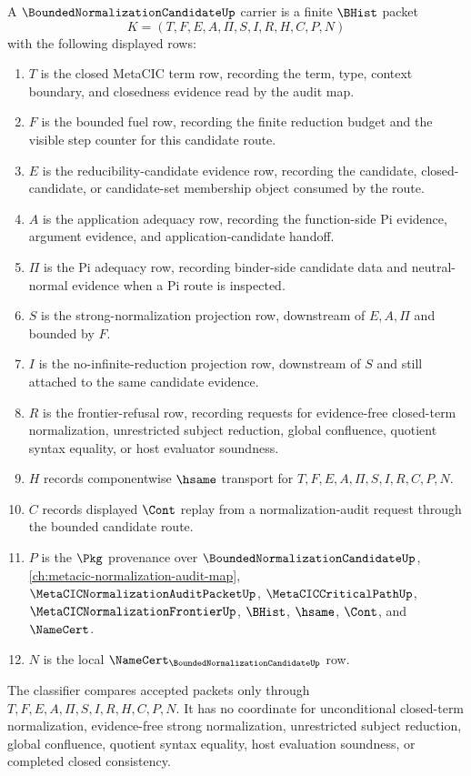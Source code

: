 \begin{definition}
\label{def:bounded-normalization-candidate-carrier}
A $\BoundedNormalizationCandidateUp$ carrier is a finite $\BHist$ packet
$$
K=(T,F,E,A,\Pi,S,I,R,H,C,P,N)
$$
with the following displayed rows:
\begin{enumerate}
\item $T$ is the closed MetaCIC term row, recording the term, type, context boundary, and closedness evidence read by the audit map.
\item $F$ is the bounded fuel row, recording the finite reduction budget and the visible step counter for this candidate route.
\item $E$ is the reducibility-candidate evidence row, recording the candidate, closed-candidate, or candidate-set membership object consumed by the route.
\item $A$ is the application adequacy row, recording the function-side Pi evidence, argument evidence, and application-candidate handoff.
\item $\Pi$ is the Pi adequacy row, recording binder-side candidate data and neutral-normal evidence when a Pi route is inspected.
\item $S$ is the strong-normalization projection row, downstream of $E,A,\Pi$ and bounded by $F$.
\item $I$ is the no-infinite-reduction projection row, downstream of $S$ and still attached to the same candidate evidence.
\item $R$ is the frontier-refusal row, recording requests for evidence-free closed-term normalization, unrestricted subject reduction, global confluence, quotient syntax equality, or host evaluator soundness.
\item $H$ records componentwise $\hsame$ transport for $T,F,E,A,\Pi,S,I,R,C,P,N$.
\item $C$ records displayed $\Cont$ replay from a normalization-audit request through the bounded candidate route.
\item $P$ is the $\Pkg$ provenance over $\BoundedNormalizationCandidateUp$, \autoref{ch:metacic-normalization-audit-map}, $\MetaCICNormalizationAuditPacketUp$, $\MetaCICCriticalPathUp$, $\MetaCICNormalizationFrontierUp$, $\BHist$, $\hsame$, $\Cont$, and $\NameCert$.
\item $N$ is the local $\NameCert_{\BoundedNormalizationCandidateUp}$ row.
\end{enumerate}
The classifier compares accepted packets only through $T,F,E,A,\Pi,S,I,R,H,C,P,N$. It has no coordinate for unconditional closed-term normalization, evidence-free strong normalization, unrestricted subject reduction, global confluence, quotient syntax equality, host evaluation soundness, or completed closed consistency.
\end{definition}

